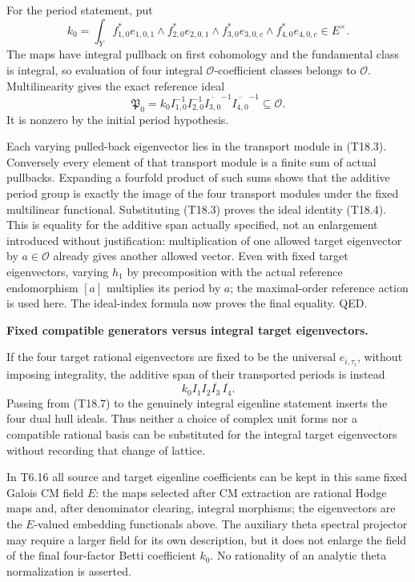 For the period statement, put \[
k_0=\int_Y f_{1,0}^*e_{1,0,1}\wedge f_{2,0}^*e_{2,0,1}
                  \wedge f_{3,0}^*e_{3,0,c}\wedge f_{4,0}^*e_{4,0,c}
\in E^\times.
\tag{T18.5}
\] The maps have integral pullback on first cohomology and the fundamental class is integral, so evaluation of four integral \(\mathcal O\)-coefficient classes belongs to \(\mathcal O\). Multilinearity gives the exact reference ideal \[
\mathfrak P_0
=k_0 I_{1,0}^{-1}I_{2,0}^{-1}
          \overline{I_{3,0}}^{-1}\overline{I_{4,0}}^{-1}
\subseteq\mathcal O.
\tag{T18.6}
\] It is nonzero by the initial period hypothesis.

Each varying pulled-back eigenvector lies in the transport module in (T18.3). Conversely every element of that transport module is a finite sum of actual pullbacks. Expanding a fourfold product of such sums shows that the additive period group is exactly the image of the four transport modules under the fixed multilinear functional. Substituting (T18.3) proves the ideal identity (T18.4). This is equality for the additive span actually specified, not an enlargement introduced without justification: multiplication of one allowed target eigenvector by \(a\in\mathcal O\) already gives another allowed vector. Even with fixed target eigenvectors, varying \(h_1\) by precomposition with the actual reference endomorphism \([a]\) multiplies its period by \(a\); the maximal-order reference action is used here. The ideal-index formula now proves the final equality. QED.

\textbf{Fixed compatible generators versus integral target eigenvectors.}

If the four target rational eigenvectors are fixed to be the universal \(e_{i,\tau_i}\), without imposing integrality, the additive span of their transported periods is instead \[
k_0 I_1I_2\overline{I_3}\,\overline{I_4}.
\tag{T18.7}
\] Passing from (T18.7) to the genuinely integral eigenline statement inserts the four dual hull ideals. Thus neither a choice of complex unit forms nor a compatible rational basis can be substituted for the integral target eigenvectors without recording that change of lattice.

In T6.16 all source and target eigenline coefficients can be kept in this same fixed Galois CM field \(E\): the maps selected after CM extraction are rational Hodge maps and, after denominator clearing, integral morphisms; the eigenvectors are the \(E\)-valued embedding functionals above. The auxiliary theta spectral projector may require a larger field for its own description, but it does not enlarge the field of the final four-factor Betti coefficient \(k_0\). No rationality of an analytic theta normalization is asserted.

